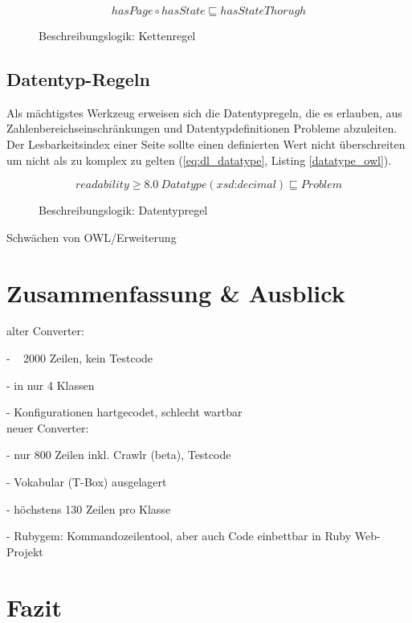 \documentclass[runningheads,a4paper]{llncs}
\begin{document}
\begin{figure}
\begin{equation}
hasPage \circ hasState \sqsubseteq hasStateThorugh
\label{eq:dl_list}
\end{equation}
\caption{Beschreibungslogik: Kettenregel}
\end{figure}



\subsection{Datentyp-Regeln}
Als mächtigstes Werkzeug erweisen sich die Datentypregeln, die es erlauben, aus Zahlenbereichseinschränkungen und Datentypdefinitionen Probleme abzuleiten. 
Der Lesbarkeitsindex einer Seite sollte einen definierten Wert nicht überschreiten um nicht als zu komplex zu gelten (\eqref{eq:dl_datatype}, Listing \ref{datatype_owl}).


\begin{figure}
\begin{equation}
readability \geq 8.0\ Datatype(\textit{xsd:decimal}) \sqsubseteq Problem
\label{eq:dl_datatype}
\end{equation}
\caption{Beschreibungslogik: Datentypregel}
\end{figure}




Schwächen von OWL/Erweiterung

\section{Zusammenfassung \& Ausblick}
alter Converter:

- ~ 2000 Zeilen, kein Testcode

- in nur 4 Klassen

- Konfigurationen hartgecodet, schlecht wartbar
\\
neuer Converter:

- nur 800 Zeilen inkl. Crawlr (beta), Testcode

- Vokabular (T-Box) ausgelagert

- höchstens 130 Zeilen pro Klasse

- Rubygem: Kommandozeilentool, aber auch Code einbettbar in Ruby Web-Projekt

\section{Fazit}

\nocite{url_dl_primer}



\end{document}
